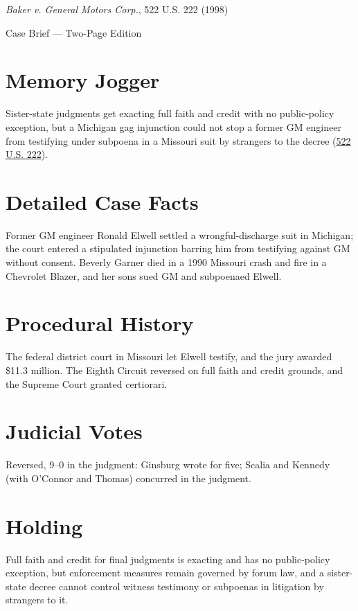 \documentclass[12pt]{article}
\begin{document}
\begin{center}
{\LARGE \textit{Baker v. General Motors Corp.}, 522 U.S. 222 (1998)\par}
\vspace{0.5em}
{\large Case Brief --- Two-Page Edition\par}
\end{center}

\section{Memory Jogger}
Sister-state judgments get exacting full faith and credit with no public-policy exception, but a Michigan gag injunction could not stop a former GM engineer from testifying under subpoena in a Missouri suit by strangers to the decree (\href{https://supreme.justia.com/cases/federal/us/522/222/}{522 U.S. 222}).

\section{Detailed Case Facts}
Former GM engineer Ronald Elwell settled a wrongful-discharge suit in Michigan; the court entered a stipulated injunction barring him from testifying against GM without consent. Beverly Garner died in a 1990 Missouri crash and fire in a Chevrolet Blazer, and her sons sued GM and subpoenaed Elwell.

\section{Procedural History}
The federal district court in Missouri let Elwell testify, and the jury awarded \$11.3 million. The Eighth Circuit reversed on full faith and credit grounds, and the Supreme Court granted certiorari.

\section{Judicial Votes}
Reversed, 9--0 in the judgment: Ginsburg wrote for five; Scalia and Kennedy (with O'Connor and Thomas) concurred in the judgment.

\section{Holding}
Full faith and credit for final judgments is exacting and has no public-policy exception, but enforcement measures remain governed by forum law, and a sister-state decree cannot control witness testimony or subpoenas in litigation by strangers to it.
\end{document}
